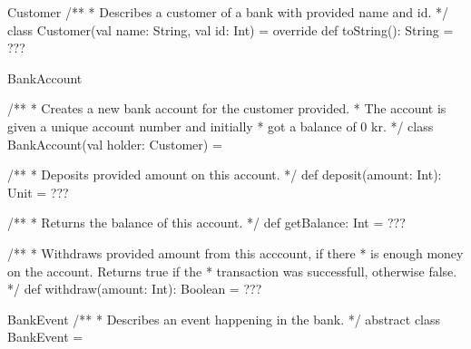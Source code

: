 \begin{ScalaSpec}{Customer}
/**
 * Describes a customer of a bank with provided name and id.
 */
class Customer(val name: String, val id: Int) = {
	override def toString(): String = ???
}

\end{ScalaSpec}


\begin{ScalaSpec}{BankAccount}

/**
 * Creates a new bank account for the customer provided.
 * The account is given a unique account number and initially
 * got a balance of 0 kr.
 */
class BankAccount(val holder: Customer) = {

 /**
   * Deposits provided amount on this account.
   */
  def deposit(amount: Int): Unit = ???

/**
   * Returns the balance of this account.
   */
  def getBalance: Int = ???

/**
   * Withdraws provided amount from this acccount, if there
   * is enough money on the account. Returns true if the 
   * transaction was successfull, otherwise false. 
   */
  def withdraw(amount: Int): Boolean = ???

}
\end{ScalaSpec}


\begin{ScalaSpec}{BankEvent}
/**
 * Describes an event happening in the bank.
 */
abstract class BankEvent = {

}

\end{ScalaSpec}



